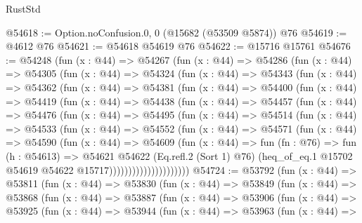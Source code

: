 \begin{lexlean}{RustStd}
\begin{coremodule}
@54618 := Option.noConfusion.{0, 0} (@15682 (@53509 @5874)) @76
@54619 := @4612 @76
@54621 := @54618 @54619 @76
@54622 := @15716 @15761
@54676 := @54248
    (fun (x : @44) =>
    @54267
      (fun (x : @44) =>
      @54286
        (fun (x : @44) =>
        @54305
          (fun (x : @44) =>
          @54324
            (fun (x : @44) =>
            @54343
              (fun (x : @44) =>
              @54362
                (fun (x : @44) =>
                @54381
                  (fun (x : @44) =>
                  @54400
                    (fun (x : @44) =>
                    @54419
                      (fun (x : @44) =>
                      @54438
                        (fun (x : @44) =>
                        @54457
                          (fun (x : @44) =>
                          @54476
                            (fun (x : @44) =>
                            @54495
                              (fun (x : @44) =>
                              @54514
                                (fun (x : @44) =>
                                @54533
                                  (fun (x : @44) =>
                                  @54552
                                    (fun (x : @44) =>
                                    @54571
                                      (fun (x : @44) =>
                                      @54590
                                        (fun (x : @44) =>
                                        @54609
                                          (fun (x : @44) =>
                                          fun (fn : @76) =>
                                          fun (h : @54613) =>
                                          @54621
                                            @54622
                                            (Eq.refl.{2} (Sort 1) @76)
                                            (heq_of_eq.{1}
                                              @15702
                                              @54619
                                              @54622
                                              @15717)))))))))))))))))))))
@54724 := @53792
    (fun (x : @44) =>
    @53811
      (fun (x : @44) =>
      @53830
        (fun (x : @44) =>
        @53849
          (fun (x : @44) =>
          @53868
            (fun (x : @44) =>
            @53887
              (fun (x : @44) =>
              @53906
                (fun (x : @44) =>
                @53925
                  (fun (x : @44) =>
                  @53944
                    (fun (x : @44) =>
                    @53963
                      (fun (x : @44) =>

\end{coremodule}
\end{lexlean}
